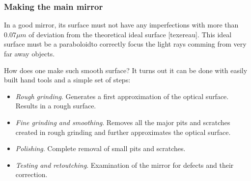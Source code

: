 \documentclass{beamer}
\begin{document}
\begin{frame}
\frametitle{Making the main mirror}
In a good mirror, its surface must not have any imperfections with more than $0.07 \mu m$ of deviation from the theoretical ideal surface [texereau].
This ideal surface must be a paraboloid\footnotemark to correctly focus the light rays comming from very far away objects.

How does one make such smooth surface? It turns out it can be done with easily built hand tools and a simple set of steps:

\begin{itemize}
\item \textit{Rough grinding}. Generates a first approximation of the optical surface. Results in a rough surface.
\item \textit{Fine grinding and smoothing}. Removes all the major pits and scratches created in rough grinding and further approximates the optical surface.
\item \textit{Polishing}. Complete removal of small pits and scratches.
\item \textit{Testing and retoutching}. Examination of the mirror for defects and their correction.
\end{itemize}
\end{frame}
\end{document}
